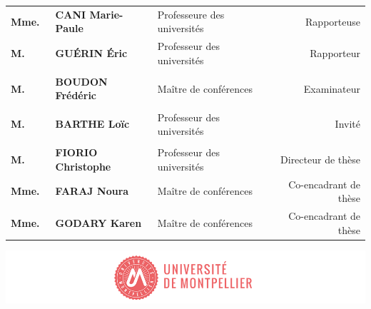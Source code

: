 \begin{titlepage}
{\begin{tabularx}{\textwidth}{l l X r}
			\textbf{Mme.~} & \textbf{CANI Marie-Paule} & Professeure des universités & Rapporteuse \\
			\textbf{M.~} & \textbf{GUÉRIN Éric} & Professeur des universités & Rapporteur \\
			\\
			\textbf{M.~} & \textbf{BOUDON Frédéric} & Maître de conférences & Examinateur \\
			\\
			\textbf{M.~} & \textbf{BARTHE Loïc} & Professeur des universités & Invité \\
			\\
			\textbf{M.~} & \textbf{FIORIO Christophe} & Professeur des universités & Directeur de thèse \\
			\textbf{Mme.~} & \textbf{FARAJ Noura} & Maître de conférences & Co-encadrant de thèse \\
			\textbf{Mme.~} & \textbf{GODARY Karen} & Maître de conférences & Co-encadrant de thèse
		\end{tabularx} 
		
		\vspace{\fill}
		\includegraphics[scale=1]{images/PhD_Couverture_LogoUM.png}
		\vspace{-15mm}}
\end{titlepage}

